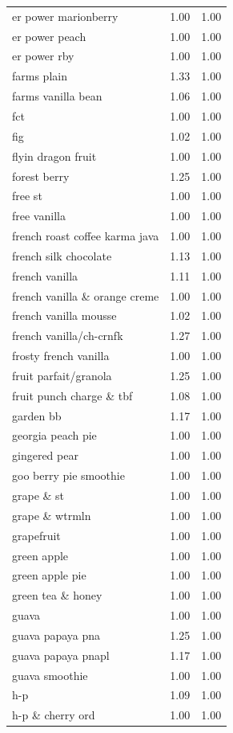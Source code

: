 \begin{table}
\begin{tabular}{lrr}
er power marionberry & 1.00 & 1.00 \\
er power peach & 1.00 & 1.00 \\
er power rby & 1.00 & 1.00 \\
farms plain & 1.33 & 1.00 \\
farms vanilla bean & 1.06 & 1.00 \\
fct & 1.00 & 1.00 \\
fig & 1.02 & 1.00 \\
flyin dragon fruit & 1.00 & 1.00 \\
forest berry & 1.25 & 1.00 \\
free st & 1.00 & 1.00 \\
free vanilla & 1.00 & 1.00 \\
french roast coffee karma java & 1.00 & 1.00 \\
french silk chocolate & 1.13 & 1.00 \\
french vanilla & 1.11 & 1.00 \\
french vanilla \& orange creme & 1.00 & 1.00 \\
french vanilla mousse & 1.02 & 1.00 \\
french vanilla/ch-crnfk & 1.27 & 1.00 \\
frosty french vanilla & 1.00 & 1.00 \\
fruit parfait/granola & 1.25 & 1.00 \\
fruit punch charge \& tbf & 1.08 & 1.00 \\
garden bb & 1.17 & 1.00 \\
georgia peach pie & 1.00 & 1.00 \\
gingered pear & 1.00 & 1.00 \\
goo berry pie smoothie & 1.00 & 1.00 \\
grape \& st & 1.00 & 1.00 \\
grape \& wtrmln & 1.00 & 1.00 \\
grapefruit & 1.00 & 1.00 \\
green apple & 1.00 & 1.00 \\
green apple pie & 1.00 & 1.00 \\
green tea \& honey & 1.00 & 1.00 \\
guava & 1.00 & 1.00 \\
guava papaya pna & 1.25 & 1.00 \\
guava papaya pnapl & 1.17 & 1.00 \\
guava smoothie & 1.00 & 1.00 \\
h-p & 1.09 & 1.00 \\
h-p \& cherry ord & 1.00 & 1.00 \\

\end{tabular}
\end{table}
